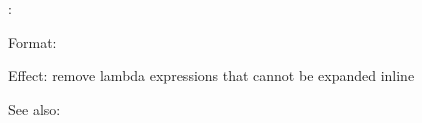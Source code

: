 \unlambda:

Format: 

Effect: remove lambda expressions that cannot be expanded inline

See also: \horizon
